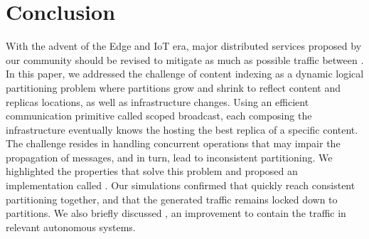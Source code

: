 \section{Conclusion}
\label{sec:conclusion}

With the advent of the Edge and IoT era, major distributed services
proposed by our community should be revised to mitigate as much as
possible traffic between \processes.  In this paper, we addressed the
challenge of content indexing as a dynamic logical partitioning
problem where partitions grow and shrink to reflect content and
replicas locations, as well as infrastructure changes.  Using an
efficient communication primitive called scoped broadcast, each
\process composing the infrastructure eventually knows the \process
hosting the best replica of a specific content.  The challenge resides
in handling concurrent operations that may impair the propagation of
messages, and in turn, lead to inconsistent partitioning.
%
We highlighted the properties that solve this problem and proposed an
implementation called \NAME.  Our simulations confirmed that
\processes quickly reach consistent partitioning together, and that
the generated traffic remains locked down to partitions.  We also
briefly discussed \NAMEC, an improvement to contain the traffic in relevant
autonomous systems.




